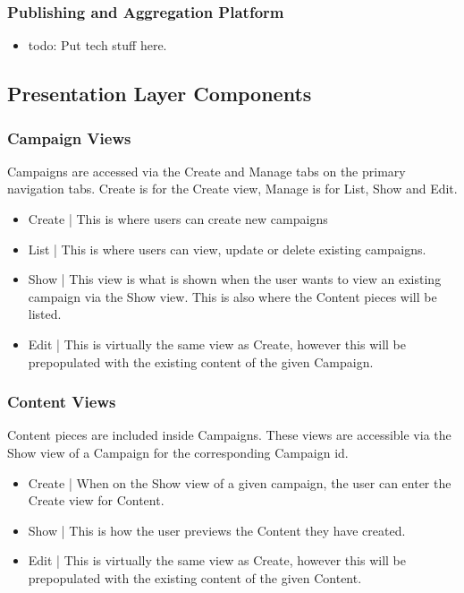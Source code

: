 \documentclass{article}
\begin{document}
\subsubsection{Publishing and Aggregation Platform}
\begin{itemize}
\item todo: Put tech stuff here.
\end{itemize}
\subsection{Presentation Layer Components}
\subsubsection{Campaign Views}
Campaigns are accessed via the Create and Manage tabs on the primary navigation tabs.  Create is for the Create view, Manage is for List, Show and Edit.
\begin{itemize}
\item Create | This is where users can create new campaigns
\item List | This is where users can view, update or delete existing campaigns.
\item Show | This view is what is shown when the user wants to view an existing campaign via the Show view.  This is also where the Content pieces will be listed.
\item Edit | This is virtually the same view as Create, however this will be prepopulated with the existing content of the given Campaign.
\end{itemize}
\subsubsection{Content Views}
Content pieces are included inside Campaigns.  These views are accessible via the Show view of a Campaign for the corresponding Campaign id.
\begin{itemize}
\item Create | When on the Show view of a given campaign, the user can enter the Create view for Content.
\item Show | This is how the user previews the Content they have created.
\item Edit | This is virtually the same view as Create, however this will be prepopulated with the existing content of the given Content.
\end{itemize}
\end{document}
